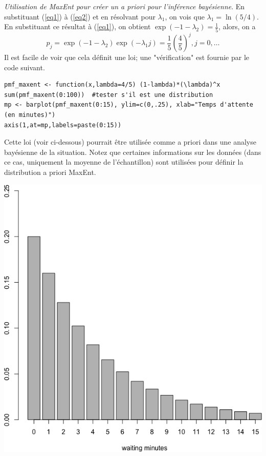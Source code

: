 \begin{Exemple} {\textit{Utilisation de MaxEnt pour créer un a priori pour l'inférence bayésienne}.}
En substituant (\ref{eq1}) à (\ref{eq2}) et en résolvant pour $\lambda_1$, on vois que   $\lambda_1=\ln (5/4)$. En substituant ce résultat à (\ref{eq1}), on obtient  $\exp(-1-\lambda_2)=\frac{1}{5}$, alors, on a  
 $$ p_j = \exp(-1-\lambda_2) \exp(-\lambda_1 j)=\frac{1}{5}\left(\frac{4}{5}\right)^j, j=0,\ldots $$
Il est facile de voir que cela définit une loi; une "vérification" est fournie par le code suivant. 
\begin{lstlisting}
pmf_maxent <- function(x,lambda=4/5) (1-lambda)*(\lambda)^x
sum(pmf_maxent(0:100))  #tester s'il est une distribution 
mp <- barplot(pmf_maxent(0:15), ylim=c(0,.25), xlab="Temps d'attente (en minutes)")
axis(1,at=mp,labels=paste(0:15))
\end{lstlisting}
Cette loi (voir ci-dessous) pourrait être utilisée comme a priori dans une analyse bayésienne de la situation. Notez que certaines informations sur les données (dans ce cas, uniquement la moyenne de l'échantillon) sont utilisées pour définir la distribution a priori MaxEnt.
\begin{center}\includegraphics[width=\linewidth]{Images/MaxEnt.png}\end{center}
\end{Exemple}

